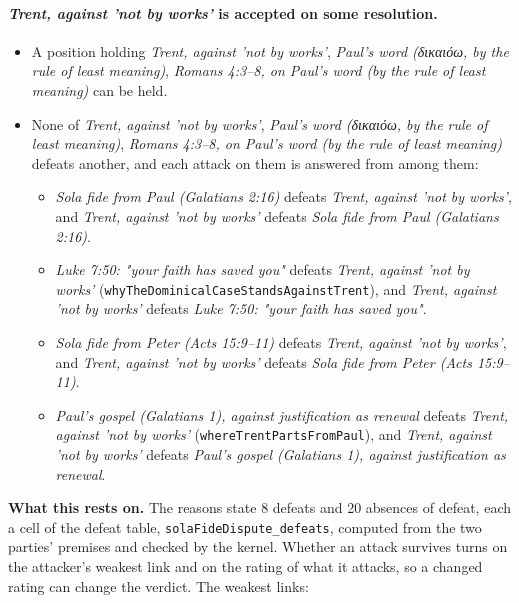 \documentclass[11pt]{article}
\begin{document}
\paragraph{\emph{Trent, against 'not by works'} is accepted on some resolution.}
\begin{itemize}
\item A position holding \emph{Trent, against 'not by works'}, \emph{Paul's word (δικαιόω, by the rule of least meaning)}, \emph{Romans 4:3–8, on Paul's word (by the rule of least meaning)} can be held.
\item None of \emph{Trent, against 'not by works'}, \emph{Paul's word (δικαιόω, by the rule of least meaning)}, \emph{Romans 4:3–8, on Paul's word (by the rule of least meaning)} defeats another, and each attack on them is answered from among them:
\begin{itemize}
\item \emph{Sola fide from Paul (Galatians 2:16)} defeats \emph{Trent, against 'not by works'}, and \emph{Trent, against 'not by works'} defeats \emph{Sola fide from Paul (Galatians 2:16)}.
\item \emph{Luke 7:50: "your faith has saved you"} defeats \emph{Trent, against 'not by works'} (\texttt{why\allowbreak{}The\allowbreak{}Dominical\allowbreak{}Case\allowbreak{}Stands\allowbreak{}Against\allowbreak{}Trent}), and \emph{Trent, against 'not by works'} defeats \emph{Luke 7:50: "your faith has saved you"}.
\item \emph{Sola fide from Peter (Acts 15:9–11)} defeats \emph{Trent, against 'not by works'}, and \emph{Trent, against 'not by works'} defeats \emph{Sola fide from Peter (Acts 15:9–11)}.
\item \emph{Paul's gospel (Galatians 1), against justification as renewal} defeats \emph{Trent, against 'not by works'} (\texttt{where\allowbreak{}Trent\allowbreak{}Parts\allowbreak{}From\allowbreak{}Paul}), and \emph{Trent, against 'not by works'} defeats \emph{Paul's gospel (Galatians 1), against justification as renewal}.
\end{itemize}
\end{itemize}
\par\noindent\textbf{What this rests on.} The reasons state 8 defeats and 20 absences of defeat, each a cell of the defeat table, \texttt{sola\allowbreak{}Fide\allowbreak{}Dispute\_\allowbreak{}defeats}, computed from the two parties' premises and checked by the kernel. Whether an attack survives turns on the attacker's weakest link and on the rating of what it attacks, so a changed rating can change the verdict. The weakest links:
\end{document}
